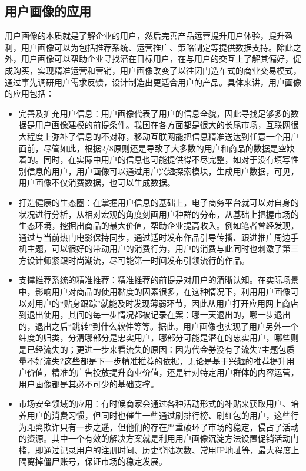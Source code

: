 	\subsection{用户画像的应用}
	用户画像的本质就是了解企业的用户，然后完善产品运营提升用户体验，提升盈利，用户画像可以为包括推荐系统、运营推广、策略制定等提供数据支持。除此之外，用户画像可以帮助企业寻找潜在目标用户，在与用户的交互上了解其偏好，促成购买，实现精准运营和营销，用户画像改变了以往闭门造车式的商业交易模式，通过事先调研用户需求反馈，设计制造出更适合用户的产品。具体来讲，用户画像的应用包括：
	\begin{itemize}
	\item 完善及扩充用户信息：用户画像代表了用户的信息全貌，因此寻找足够多的数据是用户画像建模的前提条件。我国在各方面都是很大的长尾市场，互联网很大程度上弥补了信息的不对称，移动互联网能把信息精准送达到任意一个用户面前，尽管如此，根据2/8原则还是导致了大多数的用户和商品的数据是空缺着的。同时，在实际中用户的信息也可能提供得不尽完整，如对于没有填写性别信息的用户，用户画像可以通过用户兴趣探索模块，生成用户数据，可见，用户画像不仅消费数据，也可以生成数据。
	\item 打造健康的生态圈：在掌握用户信息的基础上，电子商务平台就可以对自身的状况进行分析，从相对宏观的角度刻画用户种群的分布，从基础上把握市场的生态环境，挖掘出商品的最大价值，帮助企业提高收入。例如笔者曾经发现，通过与当前热门电影保持同步，通过适时发布作品引导传播、跟进推广周边手机主题，可以很好的带动用户的消费行为，用户的消费与此同时也刺激了第三方设计师紧跟时尚潮流，尽可能第一时间发布引领流行的作品。
	\item 支撑推荐系统的精准推荐：精准推荐的前提是对用户的清晰认知。在实际场景中，影响用户对商品的使用黏度的因素很多，在这种情况下，利用用户画像可以对用户的“贴身跟踪”就能及时发现薄弱环节，因此从用户打开应用网上商店到退出使用，其间的每一步情况都被记录在案：哪一天退出的，哪一步退出的，退出之后“跳转”到什么软件等等。据此，用户画像也实现了用户另外一个纬度的归类，分清哪部分是忠实用户，哪部分可能是潜在的忠实用户，哪些则是已经流失的；更进一步来看流失的原因：因为代金券没有了流失?主题包质量不好流失?这些都是下一步精准推荐的依据，无论是基于兴趣的推荐提升用户价值，精准的广告投放提升商业价值，还是针对特定用户群体的内容运营，用户画像都是其必不可少的基础支撑。
	\item 市场安全领域的应用：有时候商家会通过各种活动形式的补贴来获取用户、培养用户的消费习惯，但同时也催生一些通过刷排行榜、刷红包的用户，这些行为距离欺诈只有一步之遥，但他们的存在严重破环了市场的稳定，侵占了活动的资源。其中一个有效的解决方案就是利用用户画像沉淀方法设置促销活动门槛，即通过记录用户的注册时间、历史登陆次数、常用IP地址等，最大程度上隔离掉僵尸账号，保证市场的稳定发展。
	\end{itemize}

